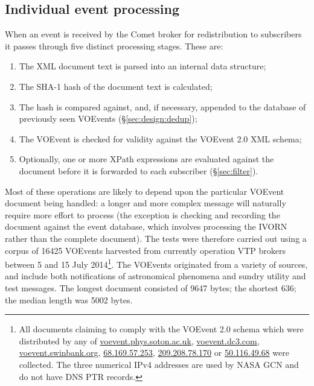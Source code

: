 \documentclass[5p,authoryear]{elsarticle}
\begin{document}
\subsection{Individual event processing}
\label{sec:perf:individual}

When an event is received by the Comet broker for redistribution to
subscribers it passes through five distinct processing stages. These are:

\begin{enumerate}

  \item{The XML document text is parsed into an internal data structure;}

  \item{The SHA-1 hash of the document text is calculated;}

  \item{The hash is compared against, and, if necessary, appended to the
  database of previously seen VOEvents (\S\ref{sec:design:dedup});}

  \item{The VOEvent is checked for validity against the VOEvent 2.0 XML schema;}

  \item{Optionally, one or more XPath expressions are evaluated against the
  document before it is forwarded to each subscriber (\S\ref{sec:filter}).}

\end{enumerate}

Most of these operations are likely to depend upon the particular VOEvent
document being handled: a longer and more complex message will naturally
require more effort to process (the exception is checking and recording the
document against the event database, which involves processing the IVORN
rather than the complete document). The tests were therefore carried out
using a corpus of 16425 VOEvents harvested from currently operation VTP
brokers between 5 and 15 July 2014\footnote{All documents claiming to comply
with the VOEvent 2.0 schema which were distributed by any of
\url{voevent.phys.soton.ac.uk}, \url{voevent.dc3.com},
\url{voevent.swinbank.org}, \url{68.169.57.253}, \url{209.208.78.170} or
\url{50.116.49.68} were collected. The three numerical IPv4 addresses are used
by NASA GCN and do not have DNS PTR records.}. The VOEvents originated from a
variety of sources, and include both notifications of astronomical phenomena
and sundry utility and test messages. The longest document consisted of 9647
bytes; the shortest 636; the median length was 5002 bytes.
\end{document}
